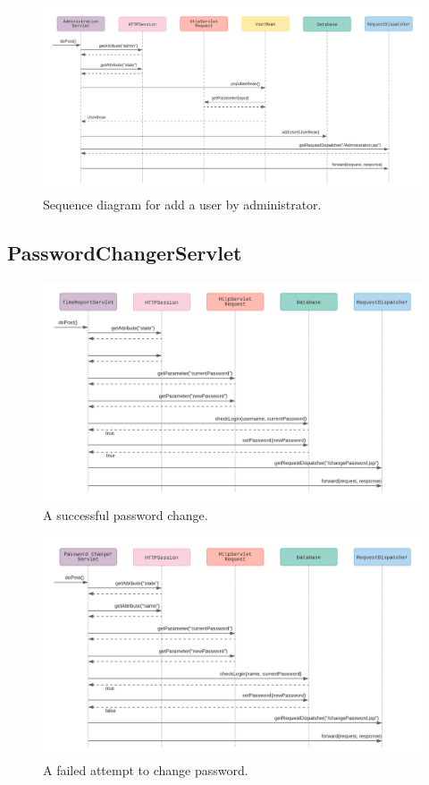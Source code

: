 \documentclass{article}
\begin{document}
\begin{figure}[H]
    \centering
    \includegraphics[scale=0.4]{images/AddUser.png}
    \caption{Sequence diagram for add a user by administrator.}
    \label{fig:failedLoginAttempt}
\end{figure}

\pagebreak
\subsection{PasswordChangerServlet}

\begin{figure}[h]
    \centering
    \includegraphics[scale=0.5]{images/successfulPasswordChange.png}
    \caption{A successful password change.}
    \label{fig:sucessfulPasswordChange}
\end{figure}

\begin{figure}[H]
    \centering
    \includegraphics[scale=0.5]{images/unsuccessfulPasswordChange.png}
    \caption{A failed attempt to change password.}
    \label{fig:failedPasswordChange}
\end{figure}
\end{document}

